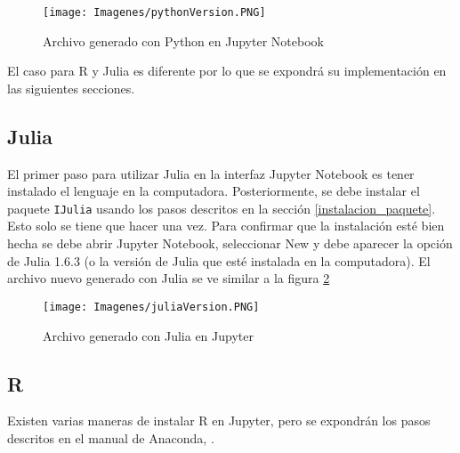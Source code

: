 \begin{figure}[h]
	\begin{center}
		\texttt{[image: Imagenes/pythonVersion.PNG]}
		\caption{Archivo generado con Python en Jupyter Notebook}
		\label{pythonVersion}
	\end{center}
\end{figure}

El caso para \textsf{R} y \textsf{Julia} es diferente por lo que se expondrá su implementación en las siguientes secciones. 

\subsection{Julia}

El primer paso para utilizar \textsf{Julia} en la interfaz \textsf{Jupyter Notebook} es tener instalado el lenguaje en la computadora. Posteriormente, se debe instalar el paquete \texttt{IJulia} usando los pasos descritos en la sección \ref{instalacion_paquete}. Esto solo se tiene que hacer una vez. Para confirmar que la instalación esté bien hecha se debe abrir \textsf{Jupyter Notebook}, seleccionar \textsf{New} y debe aparecer la opción de \textsf{Julia 1.6.3} (o la versión de \textsf{Julia} que esté instalada en la computadora). El archivo nuevo generado con \textsf{Julia} se ve similar a la figura \ref{juliaVersion_ss}

\begin{figure}[h]
	\begin{center}
		\texttt{[image: Imagenes/juliaVersion.PNG]}
		\caption{Archivo generado con Julia en Jupyter}
		\label{juliaVersion_ss}
	\end{center}
\end{figure}

\subsection{R}

Existen varias maneras de instalar \textsf{R} en \textsf{Jupyter}, pero se expondrán los pasos descritos en el manual de \textsf{Anaconda}, \cite{anaconda_doc}. 

